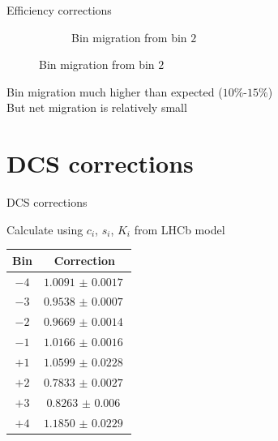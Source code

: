 \documentclass{beamer}
\begin{document}
\begin{frame}{Efficiency corrections}
\begin{figure}
\begin{subfigure}{0.38\textwidth}
      \caption{Bin migration from bin $2$}
    \end{subfigure}
  \end{figure}
  \begin{center}
    Bin migration much higher than expected ($10\%$-$15\%$) \\
    But net migration is relatively small
  \end{center}
\end{frame}

\section{DCS corrections}
\begin{frame}{DCS corrections}
  \begin{center}
    Calculate using $c_i$, $s_i$, $K_i$ from LHCb model
  \end{center}
  \centering
  \def\arraystretch{1.2}%
  \begin{tabular}{c|c}
    Bin           & Correction \\
    \hline
    $-4$          &$\SI{1.0091(17)}{}$ \\
    $-3$          &$\SI{0.9538(7)}{}$ \\
    $-2$          &$\SI{0.9669(14)}{}$ \\
    $-1$          &$\SI{1.0166(16)}{}$ \\
    $+1$          &$\SI{1.0599(228)}{}$ \\
    $+2$          &$\SI{0.7833(27)}{}$ \\
    $+3$          &$\SI{0.8263(60)}{}$ \\
    $+4$          &$\SI{1.1850(229)}{}$ \\
    \hline
  \end{tabular}
\end{frame}
\end{document}
